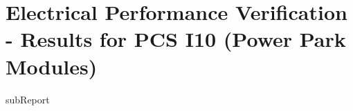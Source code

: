 \renewcommand{\DTRPcs}{I10PPM} %
\renewcommand{\DTRPcsLong}{I10 (Power Park Modules)}


    \section{Electrical Performance Verification - Results for PCS \DTRPcsLong}

    {{subReport}}
    \newpage

